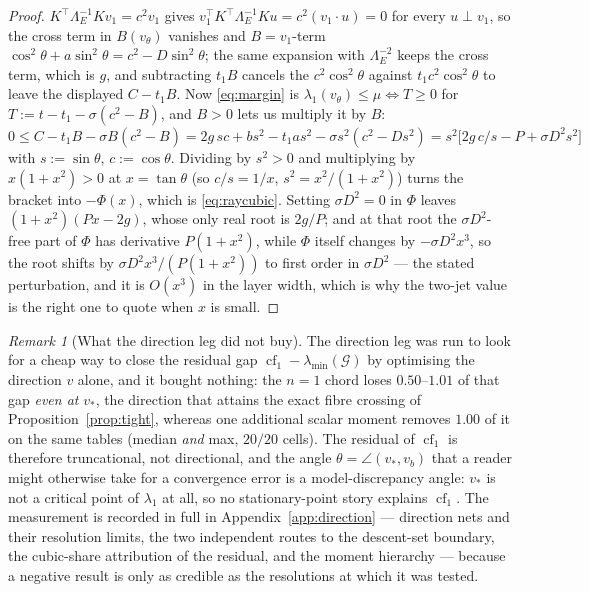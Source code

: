\documentclass[11pt]{article}
\theoremstyle{remark}
\newtheorem{remark}{Remark}[section]
\newcommand{\Gr}{\mathcal{G}}
\newcommand{\Le}{\Lambda_E}
\begin{document}
\begin{proof}
$K^{\top}\Le^{-1}Kv_1=c^{2}v_1$ gives $v_1^{\top}K^{\top}\Le^{-1}Ku=c^{2}(v_1\cdot u)=0$ for every
$u\perp v_1$, so the cross term in $B(v_\theta)$ vanishes and $B=v_1$-term $\cos^{2}\theta+a\sin^{2}
\theta=c^{2}-D\sin^{2}\theta$; the same expansion with $\Le^{-2}$ keeps the cross term, which is $g$,
and subtracting $t_1B$ cancels the $c^{2}\cos^{2}\theta$ against $t_1c^{2}\cos^{2}\theta$ to leave the
displayed $C-t_1B$. Now \eqref{eq:margin} is $\lambda_1(v_\theta)\le\mu\iff T\ge0$ for
$T:=t-t_1-\sigma(c^{2}-B)$, and $B>0$ lets us multiply it by $B$:
$0\le C-t_1B-\sigma B(c^{2}-B)=2g\,sc+bs^{2}-t_1as^{2}-\sigma s^{2}(c^{2}-Ds^{2})
=s^{2}\bigl[2g\,c/s-P+\sigma D^{2}s^{2}\bigr]$ with $s:=\sin\theta$, $c:=\cos\theta$. Dividing by
$s^{2}>0$ and multiplying by $x(1+x^{2})>0$ at $x=\tan\theta$ (so $c/s=1/x$, $s^{2}=x^{2}/(1+x^{2})$)
turns the bracket into $-\Phi(x)$, which is \eqref{eq:raycubic}. Setting $\sigma D^{2}=0$ in $\Phi$ leaves
$(1+x^{2})(Px-2g)$, whose only real root is $2g/P$; and at that root the $\sigma D^{2}$-free part of
$\Phi$ has derivative $P(1+x^{2})$, while $\Phi$ itself changes by $-\sigma D^{2}x^{3}$, so the root
shifts by $\sigma D^{2}x^{3}/(P(1+x^{2}))$ to first order in $\sigma D^{2}$ --- the stated
perturbation, and it is $O(x^{3})$ in the layer width, which is why the two-jet value is the right one
to quote when $x$ is small.
\end{proof}

\begin{remark}[What the direction leg did not buy]
\label{rem:dirleg}
The direction leg was run to look for a cheap way to close the residual gap
$\operatorname{cf}_1-\lambda_{\min}(\Gr)$ by optimising the direction $v$ alone, and it bought
nothing: the $n=1$ chord loses $0.50$--$1.01$ of that gap \emph{even at} $v_\ast$, the direction
that attains the exact fibre crossing of Proposition~\ref{prop:tight}, whereas one additional
scalar moment removes $1.00$ of it on the same tables (median \emph{and} max, $20/20$ cells).
The residual of $\operatorname{cf}_1$ is therefore truncational, not directional, and the
angle $\theta=\angle(v_\ast,v_b)$ that a reader might otherwise take for a convergence error is
a model-discrepancy angle: $v_\ast$ is not a critical point of $\lambda_1$ at all, so no
stationary-point story explains $\operatorname{cf}_1$. The measurement is recorded in full in
Appendix~\ref{app:direction} --- direction nets and their resolution limits, the two independent
routes to the descent-set boundary, the cubic-share attribution of the residual, and the moment
hierarchy --- because a negative result is only as credible as the resolutions at which it was
tested.
\end{remark}
\end{document}
